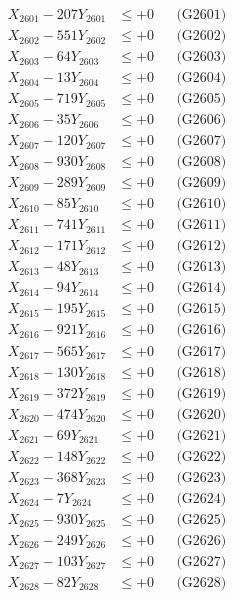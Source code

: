 \documentclass[a4paper,10pt]{article}
\begin{document}
{\begin{align}
\allowbreak
X_{2601} - 207Y_{2601} &\leq +0 && \text{(G2601)} \\
X_{2602} - 551Y_{2602} &\leq +0 && \text{(G2602)} \\
X_{2603} - 64Y_{2603} &\leq +0 && \text{(G2603)} \\
X_{2604} - 13Y_{2604} &\leq +0 && \text{(G2604)} \\
X_{2605} - 719Y_{2605} &\leq +0 && \text{(G2605)} \\
X_{2606} - 35Y_{2606} &\leq +0 && \text{(G2606)} \\
X_{2607} - 120Y_{2607} &\leq +0 && \text{(G2607)} \\
X_{2608} - 930Y_{2608} &\leq +0 && \text{(G2608)} \\
X_{2609} - 289Y_{2609} &\leq +0 && \text{(G2609)} \\
X_{2610} - 85Y_{2610} &\leq +0 && \text{(G2610)} \\
\allowbreak
X_{2611} - 741Y_{2611} &\leq +0 && \text{(G2611)} \\
X_{2612} - 171Y_{2612} &\leq +0 && \text{(G2612)} \\
X_{2613} - 48Y_{2613} &\leq +0 && \text{(G2613)} \\
X_{2614} - 94Y_{2614} &\leq +0 && \text{(G2614)} \\
X_{2615} - 195Y_{2615} &\leq +0 && \text{(G2615)} \\
X_{2616} - 921Y_{2616} &\leq +0 && \text{(G2616)} \\
X_{2617} - 565Y_{2617} &\leq +0 && \text{(G2617)} \\
X_{2618} - 130Y_{2618} &\leq +0 && \text{(G2618)} \\
X_{2619} - 372Y_{2619} &\leq +0 && \text{(G2619)} \\
X_{2620} - 474Y_{2620} &\leq +0 && \text{(G2620)} \\
\allowbreak
X_{2621} - 69Y_{2621} &\leq +0 && \text{(G2621)} \\
X_{2622} - 148Y_{2622} &\leq +0 && \text{(G2622)} \\
X_{2623} - 368Y_{2623} &\leq +0 && \text{(G2623)} \\
X_{2624} - 7Y_{2624} &\leq +0 && \text{(G2624)} \\
X_{2625} - 930Y_{2625} &\leq +0 && \text{(G2625)} \\
X_{2626} - 249Y_{2626} &\leq +0 && \text{(G2626)} \\
X_{2627} - 103Y_{2627} &\leq +0 && \text{(G2627)} \\
X_{2628} - 82Y_{2628} &\leq +0 && \text{(G2628)} \\

\end{align}}
\end{document}
